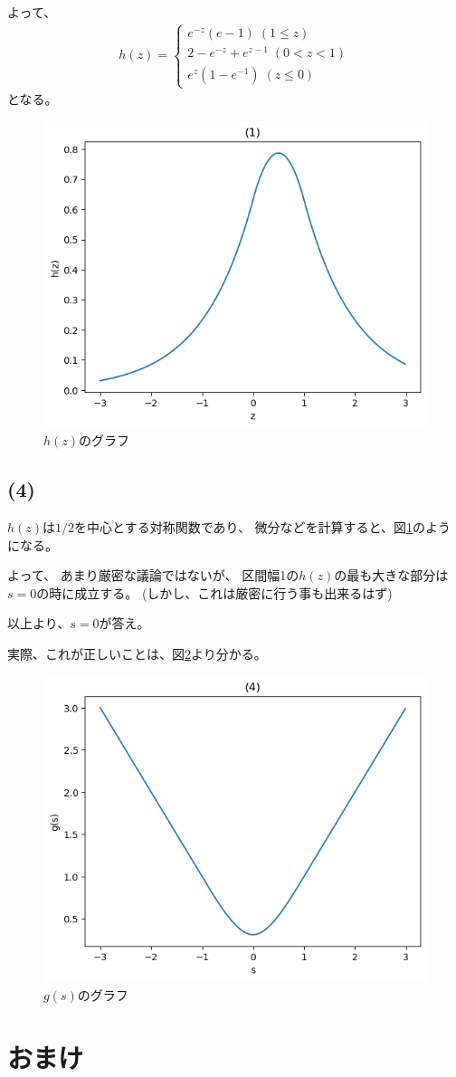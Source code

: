 \documentclass[a4paper, 10pt, dvipdfmx]{jlreq}
\begin{document}
よって、
\begin{align*}
  h(z)=
  \begin{cases}
    e^{-z}(e-1) \; (1 \leq z)       \\
    2-e^{-z}+e^{z-1} \; (0 < z < 1) \\
    e^{z}(1-e^{-1}) \; (z \leq 0)
  \end{cases}
\end{align*}
となる。

\begin{figure}[htbp]
  \begin{center}
    \includegraphics[width=0.5\columnwidth]{1.png}
    \caption{$h(z)$のグラフ}
    \label{fig:1}
  \end{center}
\end{figure}

\subsection*{(4)}

$h(z)$は$1/2$を中心とする対称関数であり、
微分などを計算すると、図\ref{fig:1}のようになる。

よって、
あまり厳密な議論ではないが、
区間幅1の$h(z)$の最も大きな部分は$s=0$の時に成立する。
(しかし、これは厳密に行う事も出来るはず)

以上より、$s=0$が答え。

実際、これが正しいことは、図\ref{fig:4}より分かる。

\begin{figure}[htbp]
  \begin{center}
    \includegraphics[width=0.5\columnwidth]{4.png}
    \caption{$g(s)$のグラフ}
    \label{fig:4}
  \end{center}
\end{figure}

\newpage

\section*{おまけ}


\end{document}
